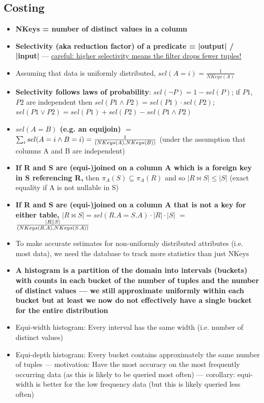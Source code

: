 \documentclass[20pt,a4paper,landscape]{extarticle}
\let\max\relax
\DeclareMathOperator*{\max}{max\:}
\begin{document}
\begin{flushleft}
\subsection{Costing}
\begin{itemize}
\item \textbf{NKeys = number of distinct values in a column}
\item \textbf{Selectivity (aka reduction factor) of a predicate = |output| / |input|} --- \underline{careful: higher selectivity means the filter drops fewer tuples!}
\item Assuming that data is uniformly distributed, $sel(A = i) = \frac{1}{NKeys(A)}$
\item \textbf{Selectivity follows laws of probability}: $sel(\neg P) = 1 - sel(P)$; if $P1$, $P2$ are independent then $sel(P1 \land P2) = sel(P1) \cdot sel(P2)$; $sel(P1 \lor P2) = sel(P1) + sel(P2) - sel(P1 \land P2)$
\item \textbf{\boldmath$sel(A = B)$ (e.g. an equijoin) $=$ $\sum_i sel(A = i \land B = i) =\allowbreak \frac{1}{\max(NKeys(A), NKeys(B))}$} (under the assumption that columns A and B are independent)
\item \textbf{If R and S are (equi-)joined on a column A which is a foreign key in S referencing R,} then $\pi_A(S) \subseteq \pi_A(R)$ and so \textbf{\boldmath$|R \bowtie S| \leq |S|$} (exact equality if A is not nullable in S)
\item \textbf{If R and S are (equi-)joined on a column A that is not a key for either table, \boldmath$|R \bowtie S| = sel(R.A = S.A) \cdot |R| \cdot |S|$} $=$ $\frac{|R||S|}{\max(NKeys(R.A), NKeys(S.A))}$
\item To make accurate estimates for non-uniformly distributed attributes (i.e. most data), we need the database to track more statistics than just NKeys
\item \textbf{A histogram is a partition of the domain into intervals (buckets) with counts in each bucket of the number of tuples and the number of distinct values --- we still approximate uniformly within each bucket but at least we now do not effectively have a single bucket for the entire distribution}
\item Equi-width histogram: Every interval has the same width (i.e. number of distinct values)
\item Equi-depth histogram: Every bucket contains approximately the same number of tuples --- motivation: Have the most accuracy on the most frequently occurring data (as this is likely to be queried most often) --- corollary: equi-width is better for the low frequency data (but this is likely queried less often)
\end{itemize}

\end{flushleft}
\end{document}

